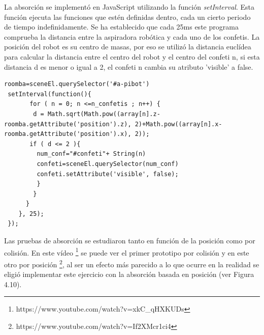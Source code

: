 La absorción se implementó en JavaScript utilizando la función \textit{setInterval}. Esta función ejecuta las funciones que estén definidas dentro, cada un cierto periodo de tiempo indefinidamente.
Se ha establecido que cada 25ms este programa comprueba la distancia entre la aspiradora robótica y cada uno de los confetis. La posición del robot es su centro de masas, por eso se  utilizó la distancia euclídea para calcular la distancia entre el centro del robot y el centro del confeti n, si esta distancia d es menor o igual a 2, el confeti n cambia su atributo 'visible' a false. 

\begin{lstlisting}
roomba=sceneEl.querySelector('#a-pibot')
 setInterval(function(){
       for ( n = 0; n <=n_confetis ; n++) {
        d = Math.sqrt(Math.pow((array[n].z-roomba.getAttribute('position').z), 2)+Math.pow((array[n].x-roomba.getAttribute('position').x), 2));
       if ( d <= 2 ){
         num_conf="#confeti"+ String(n)
         confeti=sceneEl.querySelector(num_conf)
         confeti.setAttribute('visible', false);
         }
        }
      }
    }, 25);
 });
\end{lstlisting}

Las pruebas de absorción se estudiaron tanto en función de la posición como por colisión. En este vídeo \footnote{https://www.youtube.com/watch?v=xkC\_qHXKUDs} se puede ver el primer prototipo por colisión y en este otro por posición \footnote{https://www.youtube.com/watch?v=If2XMcr1ci4}, al ser un efecto más parecido a lo que ocurre en la realidad se eligió implementar este ejercicio con la absorción basada en posición (ver Figura 4.10).

